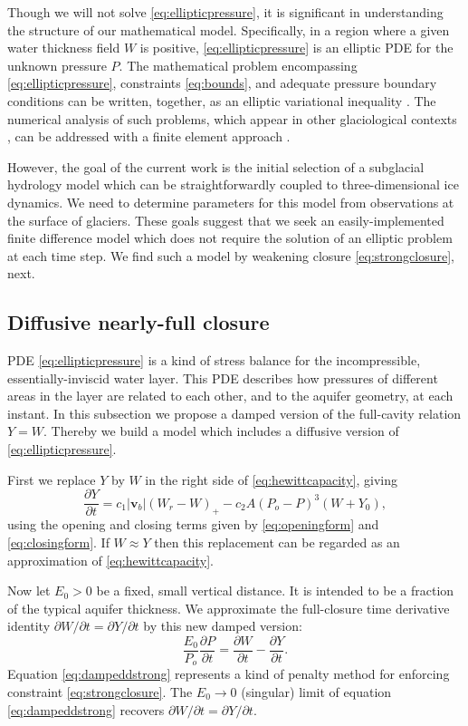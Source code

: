 \documentclass[11pt,final]{amsart}%
\newcommand\bv{\mathbf{v}}
\begin{document}
Though we will not solve \eqref{eq:ellipticpressure}, it is significant in understanding the structure of our mathematical model.  Specifically, in a region where a given water thickness field $W$ is positive, \eqref{eq:ellipticpressure} is an elliptic PDE for the unknown pressure $P$.  The mathematical problem encompassing \eqref{eq:ellipticpressure}, constraints \eqref{eq:bounds}, and adequate pressure boundary conditions can be written, together, as an elliptic variational inequality \citep{KinderlehrerStampacchia,Schoofetal2012}.  The numerical analysis of such problems, which appear in other glaciological contexts \citep{SchoofStream,JouvetBueler2012}, can be addressed with a finite element approach \citep{Ciarlet}.

However, the goal of the current work is the initial selection of a subglacial hydrology model which can be straightforwardly coupled to three-dimensional ice dynamics.  We need to determine parameters for this model from observations at the surface of glaciers.  These goals suggest that we seek an easily-implemented finite difference model which does not require the solution of an elliptic problem at each time step.  We find such a model by weakening closure \eqref{eq:strongclosure}, next.

\subsection*{Diffusive nearly-full closure}  PDE \eqref{eq:ellipticpressure} is a kind of stress balance for the incompressible, essentially-inviscid water layer.  This PDE describes how pressures of different areas in the layer are related to each other, and to the aquifer geometry, at each instant.  In this subsection we propose a damped version of the full-cavity relation $Y=W$.  Thereby we build a model which includes a diffusive version of \eqref{eq:ellipticpressure}.

First we replace $Y$ by $W$ in the right side of \eqref{eq:hewittcapacity}, giving
\begin{equation}
\frac{\partial Y}{\partial t} = c_1 |\bv_b| (W_r - W)_+ - c_2 A (P_o - P)^3 (W+Y_0), \label{eq:capacity}
\end{equation}
using the opening and closing terms given by \eqref{eq:openingform} and \eqref{eq:closingform}.  If $W \approx Y$ then this replacement can be regarded as an approximation of \eqref{eq:hewittcapacity}.

Now let $E_0>0$ be a fixed, small vertical distance.  It is intended to be a fraction of the typical aquifer thickness.  We approximate the full-closure time derivative identity $\partial W/\partial t = \partial Y/\partial t$ by this new damped version:
\begin{equation}
\frac{E_0}{P_o} \frac{\partial P}{\partial t} =  \frac{\partial W}{\partial t}  - \frac{\partial Y}{\partial t}.\label{eq:dampeddstrong}
\end{equation}
Equation \eqref{eq:dampeddstrong} represents a kind of penalty method for enforcing constraint \eqref{eq:strongclosure}.  The $E_0\to 0$ (singular) limit of equation \eqref{eq:dampeddstrong} recovers $\partial W/\partial t = \partial Y/\partial t$.
\end{document}
